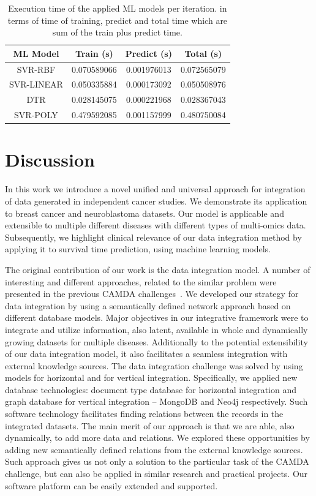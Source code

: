 \documentclass{bmcart}
\begin{document}
\begin{table}[H]
\caption{Execution time of the applied ML models per iteration. in terms of time of training, predict and total time which are sum of the train plus predict time.}  \label{tab2}
\centering
\begin{tabular}{cccc}
\toprule
\textbf{ML Model} & \textbf{Train (s)} & \textbf{Predict (s)} & \textbf{Total (s)} \\
\midrule
SVR-RBF & 0.070589066 & 0.001976013 & 0.072565079 \\
SVR-LINEAR & 0.050335884 & 0.000173092 & 0.050508976 \\
DTR & 0.028145075 & 0.000221968 & 0.028367043 \\
SVR-POLY & 0.479592085 & 0.001157999 & 0.480750084 \\
\bottomrule
\end{tabular}
\end{table}


\section{Discussion}

In this work we introduce a novel unified and universal approach for
integration of data generated in independent cancer studies. We
demonstrate its application to breast cancer and neuroblastoma
datasets. Our model is applicable and extensible to multiple different
diseases with different types of multi-omics data. Subsequently, we
highlight clinical relevance of our data integration method by applying
it to survival time prediction, using machine learning models.

The original contribution of our work is the data integration model. A
number of  interesting and different approaches, related to the similar
problem were presented in the previous CAMDA challenges~\cite{35}. We
developed our strategy for data integration by using a semantically
defined network approach based on different database models. Major
objectives in our integrative framework were to integrate and utilize
information, also latent, available in whole and dynamically growing
datasets for multiple diseases. Additionally to the potential
extensibility of our data integration model, it also facilitates a
seamless integration with external knowledge sources. The data
integration challenge was solved by using models for horizontal and for
vertical integration. Specifically, we applied new database
technologies: document type database for horizontal integration and
graph database for vertical integration -- MongoDB and Neo4j
respectively. Such software technology facilitates finding relations
between the records in the integrated datasets. The main merit of our
approach is that we are able, also dynamically, to add more data and
relations. We explored these opportunities by adding new semantically
defined relations from the external knowledge sources. Such approach
gives us not only a solution to the particular task of the CAMDA
challenge, but can also be applied in similar research and practical
projects. Our software platform can be easily extended and supported.
\end{document}

